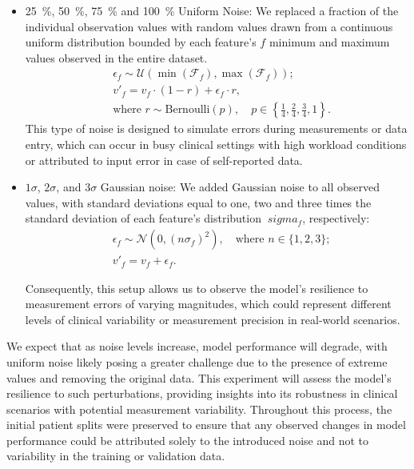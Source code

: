 \begin{itemize}
    \item \qty{25}{\percent}, \qty{50}{\percent}, \qty{75}{\percent} and \qty{100}{\percent} Uniform Noise: We replaced a fraction of the individual observation values with random values drawn from a continuous uniform distribution bounded by each feature's \(f\) minimum and maximum  values observed in the entire dataset.
    \begin{align*}
        & \epsilon_f \sim \mathcal{U}(\min(\mathcal{F}_f), \max(\mathcal{F}_f)); \\
        & v'_f = v_f \cdot (1 - r) + \epsilon_f \cdot r, \\
        & \text{where } r \sim \text{Bernoulli}(p), \quad p \in \left\{\frac{1}{4}, \frac{2}{4}, \frac{3}{4}, 1\right\}.
    \end{align*}
    This type of noise is designed to simulate errors during measurements or data entry, which can occur in busy clinical settings with high workload conditions or attributed to input error in case of self-reported data.
    \item $1\sigma$, $2\sigma$, and $3\sigma$ Gaussian noise: We added Gaussian noise to all observed values, with standard deviations equal to one, two and three times the standard deviation of each feature's distribution \(\ sigma_f \), respectively:
    \begin{align*}
       & \epsilon_f \sim {\mathcal{N}}(0, (n\sigma_f)^{2}), \quad \text{where } n \in \{1, 2, 3\}; \\
       & v'_f = v_f + \epsilon_f.
    \end{align*}

    Consequently, this setup allows us to observe the model's resilience to measurement errors of varying magnitudes, which could represent different levels of clinical variability or measurement precision in real-world scenarios.
\end{itemize}

We expect that as noise levels increase, model performance will degrade, with uniform noise likely posing a greater challenge due to the presence of extreme values and removing the original data. This experiment will assess the model's resilience to such perturbations, providing insights into its robustness in clinical scenarios with potential measurement variability. Throughout this process, the initial patient splits were preserved to ensure that any observed changes in model performance could be attributed solely to the introduced noise and not to variability in the training or validation data.


